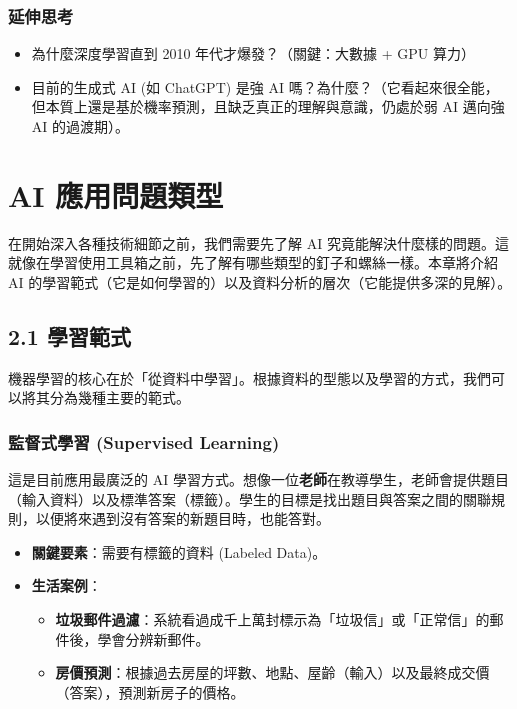 \documentclass[
  letterpaper,
  DIV=11,
  numbers=noendperiod]{scrreprt}
\providecommand{\tightlist}{%
  \setlength{\itemsep}{0pt}\setlength{\parskip}{0pt}}
\begin{document}
\section{延伸思考}\label{ux5ef6ux4f38ux601dux8003}

\begin{itemize}
\tightlist
\item
  為什麼深度學習直到 2010 年代才爆發？（關鍵：大數據 + GPU 算力）
\item
  目前的生成式 AI (如 ChatGPT) 是強 AI
  嗎？為什麼？（它看起來很全能，但本質上還是基於機率預測，且缺乏真正的理解與意識，仍處於弱
  AI 邁向強 AI 的過渡期）。
\end{itemize}

\part{AI 應用問題類型}\label{ai-ux61c9ux7528ux554fux984cux985eux578b}

在開始深入各種技術細節之前，我們需要先了解 AI
究竟能解決什麼樣的問題。這就像在學習使用工具箱之前，先了解有哪些類型的釘子和螺絲一樣。本章將介紹
AI
的學習範式（它是如何學習的）以及資料分析的層次（它能提供多深的見解）。

\chapter{2.1 學習範式}\label{sec-learning-paradigms}

機器學習的核心在於「從資料中學習」。根據資料的型態以及學習的方式，我們可以將其分為幾種主要的範式。

\section{監督式學習 (Supervised
Learning)}\label{sec-supervised-learning}

這是目前應用最廣泛的 AI
學習方式。想像一位\textbf{老師}在教導學生，老師會提供題目（輸入資料）以及標準答案（標籤）。學生的目標是找出題目與答案之間的關聯規則，以便將來遇到沒有答案的新題目時，也能答對。

\begin{itemize}
\tightlist
\item
  \textbf{關鍵要素}：需要有標籤的資料 (Labeled Data)。
\item
  \textbf{生活案例}：

  \begin{itemize}
  \tightlist
  \item
    \textbf{垃圾郵件過濾}：系統看過成千上萬封標示為「垃圾信」或「正常信」的郵件後，學會分辨新郵件。
  \item
    \textbf{房價預測}：根據過去房屋的坪數、地點、屋齡（輸入）以及最終成交價（答案），預測新房子的價格。
  \end{itemize}
\end{itemize}
\end{document}
